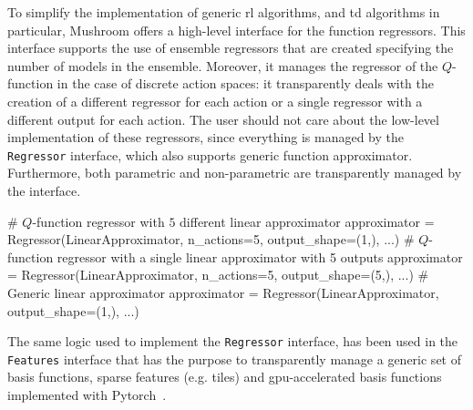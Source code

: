 To simplify the implementation of generic \gls{rl} algorithms, and \gls{td} algorithms in particular, Mushroom offers a high-level interface for the function regressors. This interface supports the use of ensemble regressors that are created specifying the number of models in the ensemble. Moreover, it manages the regressor of the $Q$-function in the case of discrete action spaces: it transparently deals with the creation of a different regressor for each action or a single regressor with a different output for each action. The user should not care about the low-level implementation of these regressors, since everything is managed by the \texttt{Regressor} interface, which also supports generic function approximator. Furthermore, both parametric and non-parametric are transparently managed by the interface.
\begin{python}
# $Q$-function regressor with $5$ different linear approximator
approximator = Regressor(LinearApproximator, n_actions=5, output_shape=(1,), ...)
# $Q$-function regressor with a single linear approximator with 5 outputs
approximator = Regressor(LinearApproximator, n_actions=5, output_shape=(5,), ...)
# Generic linear approximator
approximator = Regressor(LinearApproximator, output_shape=(1,), ...)
\end{python}
The same logic used to implement the \texttt{Regressor} interface, has been used in the \texttt{Features} interface that has the purpose to transparently manage a generic set of basis functions, sparse features (e.g. tiles) and \gls{gpu}-accelerated basis functions implemented with Pytorch~\cite{paszke2017automatic}.
